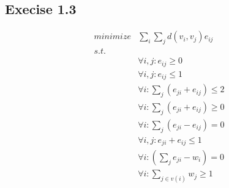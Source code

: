 \documentclass[11pt,a4paper]{article}
\begin{document}
\subsection{Execise 1.3}
\begin{align*}
    minimize & \sum_i \sum_j d(v_i, v_j) e_{ij} \\
    s.t.     & \\
             & \forall i, j: e_{ij} \geq 0 \\
             & \forall i, j: e_{ij} \leq 1 \\
             & \forall i: \sum_j (e_{ji} + e_{ij}) \leq 2 \\
             & \forall i: \sum_j (e_{ji} + e_{ij}) \geq 0 \\
             & \forall i: \sum_j (e_{ji} - e_{ij}) = 0 \\
             & \forall i,j: e_{ji} + e_{ij} \leq 1 \\
             & \forall i: (\sum_j e_{ji} - w_i) = 0 \\
             & \forall i: \sum_{j \in v(i)} w_j \geq 1 \\
\end{align*}



\end{document}
